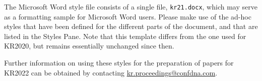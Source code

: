 \documentclass{article}
\begin{document}
The Microsoft Word style file consists of a single file, \texttt{kr21.docx},
which may serve as a formatting sample for Microsoft Word users.  Please make
use of the ad-hoc styles that have been defined for the different parts of the
document, and that are listed in the Styles Pane.  Note that this template
differs from the one used for KR2020, but remains essentially unchanged since then.

Further information on using these styles for the preparation of papers for
KR2022 can be obtained by contacting
\href{mailto:kr.proceedings@confdna.com}{kr.proceedings@confdna.com}.




\end{document}
